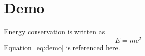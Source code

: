 \documentclass{article}
\begin{document}
\section{Demo}
Energy conservation is written as
\begin{equation}
E = m c^{2} \label{eq:demo}
\end{equation}
Equation~\ref{eq:demo} is referenced here.
\end{document}
